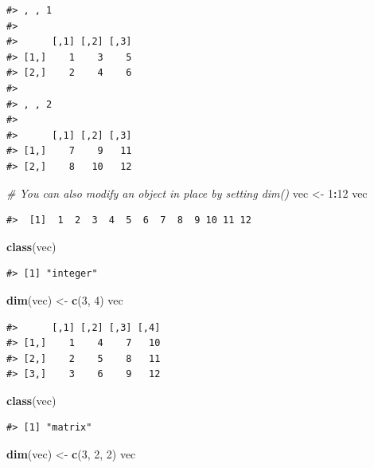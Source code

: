 \documentclass[]{book}
\newenvironment{Shaded}{\begin{snugshade}}{\end{snugshade}}
\newcommand{\KeywordTok}[1]{\textcolor[rgb]{0.13,0.29,0.53}{\textbf{#1}}}
\newcommand{\DecValTok}[1]{\textcolor[rgb]{0.00,0.00,0.81}{#1}}
\newcommand{\StringTok}[1]{\textcolor[rgb]{0.31,0.60,0.02}{#1}}
\newcommand{\CommentTok}[1]{\textcolor[rgb]{0.56,0.35,0.01}{\textit{#1}}}
\newcommand{\OperatorTok}[1]{\textcolor[rgb]{0.81,0.36,0.00}{\textbf{#1}}}
\newcommand{\NormalTok}[1]{#1}
\theoremstyle{definition}
\theoremstyle{definition}
\theoremstyle{definition}
\theoremstyle{remark}
\begin{document}
\begin{verbatim}
#> , , 1
#> 
#>      [,1] [,2] [,3]
#> [1,]    1    3    5
#> [2,]    2    4    6
#> 
#> , , 2
#> 
#>      [,1] [,2] [,3]
#> [1,]    7    9   11
#> [2,]    8   10   12
\end{verbatim}

\begin{Shaded}
\begin{Highlighting}[]
\CommentTok{# You can also modify an object in place by setting dim()}
\NormalTok{vec <-}\StringTok{ }\DecValTok{1}\OperatorTok{:}\DecValTok{12}
\NormalTok{vec}
\end{Highlighting}
\end{Shaded}

\begin{verbatim}
#>  [1]  1  2  3  4  5  6  7  8  9 10 11 12
\end{verbatim}

\begin{Shaded}
\begin{Highlighting}[]
\KeywordTok{class}\NormalTok{(vec)}
\end{Highlighting}
\end{Shaded}

\begin{verbatim}
#> [1] "integer"
\end{verbatim}

\begin{Shaded}
\begin{Highlighting}[]
\KeywordTok{dim}\NormalTok{(vec) <-}\StringTok{ }\KeywordTok{c}\NormalTok{(}\DecValTok{3}\NormalTok{, }\DecValTok{4}\NormalTok{)}
\NormalTok{vec}
\end{Highlighting}
\end{Shaded}

\begin{verbatim}
#>      [,1] [,2] [,3] [,4]
#> [1,]    1    4    7   10
#> [2,]    2    5    8   11
#> [3,]    3    6    9   12
\end{verbatim}

\begin{Shaded}
\begin{Highlighting}[]
\KeywordTok{class}\NormalTok{(vec)}
\end{Highlighting}
\end{Shaded}

\begin{verbatim}
#> [1] "matrix"
\end{verbatim}

\begin{Shaded}
\begin{Highlighting}[]
\KeywordTok{dim}\NormalTok{(vec) <-}\StringTok{ }\KeywordTok{c}\NormalTok{(}\DecValTok{3}\NormalTok{, }\DecValTok{2}\NormalTok{, }\DecValTok{2}\NormalTok{)}
\NormalTok{vec}
\end{Highlighting}
\end{Shaded}
\end{document}
